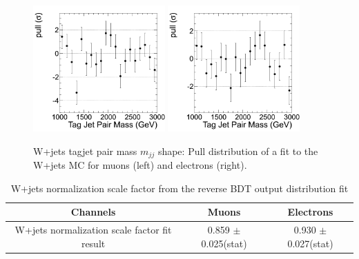 \begin{figure}
\begin{center}
\includegraphics[width=0.45\textwidth]{figs/wpj/EWKW2jetstagjetmjj_WpJ_muon_Model_12_Validate_pull.png}
\includegraphics[width=0.45\textwidth]{figs/wpj/EWKW2jetstagjetmjj_WpJ_electron_Model_12_Validate_pull.png}
\end{center}
\caption{\label{fig:WpJFit} W+jets tagjet pair mass $m_{jj}$ shape:
Pull distribution of a fit to the W+jets MC for muons (left) and electrons (right).}
\label{fig:WpJFit_Dijet_Pull}
\end{figure}

\begin{table}[htb]
\centering
\begin{tabular}{|c|c|c|}
\hline
Channels &  Muons & Electrons \\ \hline
W+jets normalization scale factor fit result & 0.859 $\pm$ 0.025(stat) & 0.930 $\pm$ 0.027(stat)\\ \hline
\end{tabular}
\caption{W+jets normalization scale factor from the reverse BDT output distribution fit}
\label{tab:bdtfitcontrol}
\end{table}


